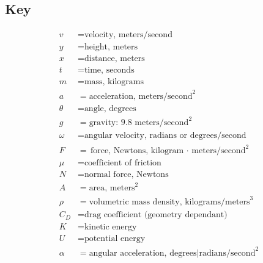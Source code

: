 \documentclass[10pt, letterpaper]{book}
\begin{document}
    \subsection*{Key}
    \begin{align*}
        v       & = \text{velocity, meters/second}                                  \\
        y       & = \text{height, meters}                                           \\
        x       & = \text{distance, meters}                                         \\
        t       & = \text{time, seconds}                                            \\
        m       & = \text{mass, kilograms}                                          \\
        a       & = \text{acceleration, meters/second}^{2}                          \\
        \theta  & = \text{angle, degrees}                                           \\
        g       & = \text{gravity: 9.8 meters/second}^{2}                           \\
        \omega  & = \text{angular velocity, radians or degrees/second}              \\
        F       & = \text{force, Newtons, kilogram $\cdot$ meters/second}^{2}       \\
        \mu     & = \text{coefficient of friction}                                  \\
        N       & = \text{normal force, Newtons}                                    \\
        A       & = \text{area, meters}^{2}                                         \\
        \rho    & = \text{volumetric mass density, kilograms/meters}^{3}            \\
        C_{D}   & = \text{drag coefficient (geometry dependant)}                    \\
        K       & = \text{kinetic energy}                                           \\
        U       & = \text{potential energy}                                         \\
        \alpha  & = \text{angular acceleration, degrees|radians/second}^{2}
    \end{align*}
\end{document}

